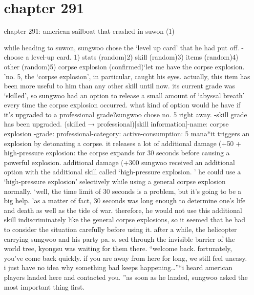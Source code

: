 \section{chapter 291}

chapter 291: american sailboat that crashed in suwon (1)




while heading to suwon, sungwoo chose the ‘level up card' that he had put off.
-choose a level-up card.
1) stats (random)2) skill (random)3) items (random)4) other (random)5) corpse explosion (confirmed)‘let me have the corpse explosion.
'no.
 5, the ‘corpse explosion', in particular, caught his eyes.
 actually, this item has been more useful to him than any other skill until now.
its current grade was ‘skilled', so sungwoo had an option to release a small amount of ‘abyssal breath' every time the corpse explosion occurred.
 what kind of option would he have if it's upgraded to a professional grade?sungwoo chose no.
 5 right away.
-skill grade has been upgraded.
 (skilled → professional)[skill information]-name: corpse explosion
-grade: professional-category: active-consumption: 5 mana*it triggers an explosion by detonating a corpse.
 it releases a lot of additional damage (+50%
+ high-pressure explosion: the corpse expands for 30 seconds before causing a powerful explosion.
 additional damage (+300%
sungwoo received an additional option with the additional skill called ‘high-pressure explosion.
' he could use a ‘high-pressure explosion' selectively while using a general corpse explosion normally.
‘well, the time limit of 30 seconds is a problem, but it's going to be a big help.
'as a matter of fact, 30 seconds was long enough to determine one's life and death as well as the tide of war.
 therefore, he would not use this additional skill indiscriminately like the general corpse explosions, so it seemed that he had to consider the situation carefully before using it.
after a while, the helicopter carrying sungwoo and his party pa.
s.
sed through the invisible barrier of the world tree, kyongsu was waiting for them there.
“welcome back.
 fortunately, you've come back quickly.
 if you are away from here for long, we still feel uneasy.
 i just have no idea why something bad keeps happening…”“i heard american players landed here and contacted you.
”as soon as he landed, sungwoo asked the most important thing first.
